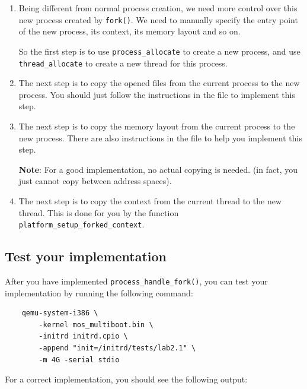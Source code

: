 \begin{enumerate}
    \item Being different from normal process creation, we need more control over this new process
          created by \texttt{fork()}. We need to manually specify the entry point of the new process,
          its context, its memory layout and so on.

          So the first step is to use \texttt{process\_allocate} to create a new process, and
          use \texttt{thread\_allocate} to create a new thread for this process.

    \item The next step is to copy the opened files from the current process to the new process.
          You should just follow the instructions in the file to implement this step.

    \item The next step is to copy the memory layout from the current process to the new process.
          There are also instructions in the file to help you implement this step.

          \textbf{Note}: For a good implementation, no actual copying is needed.
          (in fact, you just cannot copy between address spaces).

    \item The next step is to copy the context from the current thread to the new thread.
          This is done for you by the function \texttt{platform\_setup\_forked\_context}.
\end{enumerate}

\subsection{Test your implementation}

After you have implemented \texttt{process\_handle\_fork()}, you can test your implementation
by running the following command:

\begin{verbatim}
    qemu-system-i386 \
        -kernel mos_multiboot.bin \
        -initrd initrd.cpio \
        -append "init=/initrd/tests/lab2.1" \
        -m 4G -serial stdio
\end{verbatim}

For a correct implementation, you should see the following output:

